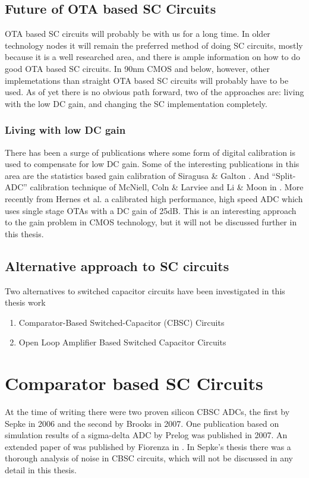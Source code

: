 \subsection{Future of OTA based SC Circuits}
OTA based SC circuits will probably be with us for a long time. In
older technology nodes it will remain the preferred method of doing SC
circuits, mostly because it is a well researched area, and there is
ample information on how to do good OTA based SC circuits. In 90nm
CMOS and below, however, other implemetations than straight OTA based
SC circuits will probably have to be used. As of yet there is no
obvious path forward, two of the approaches are: living with the low
DC gain, and changing the SC implementation completely. 

\subsubsection{Living with low DC gain}
There has been a surge of publications where some form of digital
calibration is used to compensate for low DC gain. Some of the interesting
publications in this area are the statistics based gain calibration of
Siragusa \& Galton \cite{siragusa04}. And ``Split-ADC'' calibration
technique of McNiell, Coln \& Larviee \cite{mcniell05} and Li \& Moon
in \cite{li03}. More recently from Hernes et al. \cite{hernes07} a
 calibrated high performance, high speed ADC which uses single stage
 OTAs with a DC gain of 25dB. This is an interesting approach to the
 gain problem in CMOS technology, but it will not be discussed further
 in this thesis.

\subsection{Alternative approach to SC circuits}
Two alternatives to switched capacitor circuits have been investigated
in this thesis work
\begin{enumerate}
\item Comparator-Based Switched-Capacitor (CBSC) Circuits 
\item Open Loop Amplifier Based Switched Capacitor Circuits
\end{enumerate}


\section{Comparator based SC Circuits}
At the time of writing there were two proven silicon CBSC ADCs, the first by Sepke
\cite{sepke06} in 2006 and the second by Brooks \cite{brooks07} in
2007. One publication based on simulation
results of a sigma-delta ADC by Prelog \cite{prelog07} was published in 2007. An extended paper of
\cite{sepke06} was published by Fiorenza in \cite{fiorenza06}. In
Sepke's thesis\cite{sepke06th} there was a thorough analysis of noise
in CBSC circuits, which will not be discussed in any detail in this
thesis. 

